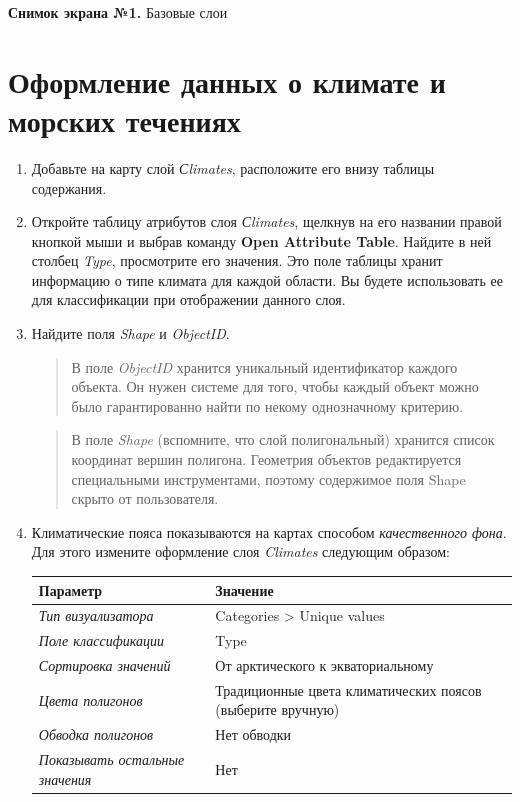 \documentclass[]{book}
\theoremstyle{definition}
\theoremstyle{definition}
\theoremstyle{definition}
\theoremstyle{remark}
\begin{document}
\textbf{Снимок экрана №1.} Базовые слои

\hypertarget{map-design-climates-thematic}{%
\section{Оформление данных о климате и морских
течениях}\label{map-design-climates-thematic}}

\begin{enumerate}
\def\labelenumi{\arabic{enumi}.}
\item
  Добавьте на карту слой \emph{Сlimates}, расположите его внизу таблицы
  содержания.
\item
  Откройте таблицу атрибутов слоя \emph{Сlimates}, щелкнув на его
  названии правой кнопкой мыши и выбрав команду \textbf{Open Attribute
  Table}. Найдите в ней столбец \emph{Type}, просмотрите его значения.
  Это поле таблицы хранит информацию о типе климата для каждой области.
  Вы будете использовать ее для классификации при отображении данного
  слоя.
\item
  Найдите поля \emph{Shape} и \emph{ObjectID}.

  \begin{quote}
  В поле \emph{ObjectID} хранится уникальный идентификатор каждого
  объекта. Он нужен системе для того, чтобы каждый объект можно было
  гарантированно найти по некому однозначному критерию.
  \end{quote}

  \begin{quote}
  В поле \emph{Shape} (вспомните, что слой полигональный) хранится
  список координат вершин полигона. Геометрия объектов редактируется
  специальными инструментами, поэтому содержимое поля Shape скрыто от
  пользователя.
  \end{quote}
\item
  Климатические пояса показываются на картах способом
  \emph{качественного фона}. Для этого измените оформление слоя
  \emph{Climates} следующим образом:

  \begin{longtable}[]{@{}ll@{}}
  \toprule
  \textbf{Параметр} & \textbf{Значение}\tabularnewline
  \midrule
  \endhead
  \emph{Тип визуализатора} & Categories \textgreater{} Unique
  values\tabularnewline
  \emph{Поле классификации} & Type\tabularnewline
  \emph{Сортировка значений} & От арктического к
  экваториальному\tabularnewline
  \emph{Цвета полигонов} & Традиционные цвета климатических поясов
  (выберите вручную)\tabularnewline
  \emph{Обводка полигонов} & Нет обводки\tabularnewline
  \emph{Показывать остальные значения} & Нет\tabularnewline
  \bottomrule
  \end{longtable}


\end{enumerate}
\end{document}
